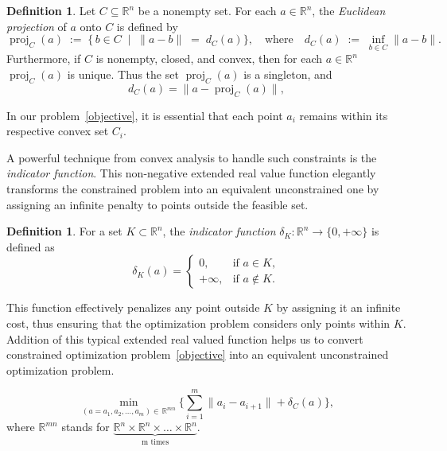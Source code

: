 \documentclass[12pt]{article}
\theoremstyle{plain}
\theoremstyle{definition}
\newtheorem{definition}[theorem]{Definition}
\begin{document}
\begin{definition}	Let $C \subseteq \mathbb{R}^n$ be a nonempty set.
	For each $a \in \mathbb{R}^n$, the \emph{Euclidean projection} of $a$ onto $C$ is defined by
	\[
	\operatorname{proj}_C(a)
	\;:=\;
	\{\,b \in C \;\mid\; \|a - b\| \;=\; d_C(a)\},
	\quad\text{where}\quad
	d_C(a)
	\;:=\;
	\inf_{b \in C}
	\|a - b\|.
	\]
	Furthermore, if $C$ is nonempty, closed, and convex, then for each $a \in \mathbb{R}^n$ $\operatorname{proj}_C(a)$ is unique. Thus the set $\operatorname{proj}_C(a)$ is a singleton, and 
	\[
	d_C(a) = \| a - \operatorname{proj}_C(a) \|,
	\]
	
\end{definition}



In our problem~\ref{objective}, it is essential that each point $ a_i $ remains within its respective convex set $ C_i $.

A powerful technique from convex analysis to handle such constraints is the \emph{indicator function}. This non-negative extended real value function elegantly transforms the constrained problem into an equivalent unconstrained one by assigning an infinite penalty to points outside the feasible set.


\begin{definition} 	For a set $K \subset \mathbb{R}^n$, the \textit{indicator function} $\delta_K : \mathbb{R}^n \to \{0, +\infty\}$ is defined as
	$$
	\delta_K(a) = \begin{cases}
		0, & \text{if } a \in K, \\
		+\infty, & \text{if } a \notin K.
	\end{cases}
	$$
	
\end{definition}

This function effectively penalizes any point outside $K$ by assigning it an infinite cost, thus ensuring that the optimization problem considers only points within $K$. Addition of this typical extended real valued function helps us to convert constrained optimization problem~\ref{objective} into an equivalent unconstrained optimization problem.



\begin{equation} 
	\min_{(a=a_1, a_2, \dots, a_m) \in\, \mathbb{R}^{mn}} \Biggl\{
	\sum_{i=1}^{m} \|a_i - a_{i+1}\| +  \delta_{C}(a)
	\Biggr\},
	\label{unconstrainedobjective}
\end{equation}
where $\mathbb{R}^{mn}$ stands for $\underbrace{\mathbb{R}^{n} \times \mathbb{R}^{n} \times \dots \times \mathbb{R}^{n}}_{\text{m times}}$. 
\end{document}
